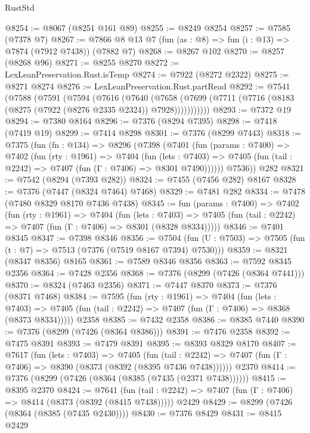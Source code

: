 \begin{lexlean}{RustStd}
\begin{coremodule}
@8254 := @8067 (@8251 @161 @89)
@8255 := @8249 @8254
@8257 := @7585 (@7378 @7)
@8267 := @7866 @8 @13 @7 (fun (as : @8) => fun (i : @13) => @7874 (@7912 @7438)) (@7882 @7)
@8268 := @8267 @102
@8270 := @8257 (@8268 @96)
@8271 := @8255 @8270
@8272 := LexLeanPreservation.Rust.isTemp
@8274 := @7922 (@8272 @2322)
@8275 := @8271 @8274
@8276 := LexLeanPreservation.Rust.partRead
@8292 := @7541
    (@7588
      (@7591
        (@7594
          (@7616
            (@7640
              (@7658 (@7699 (@7711 (@7716 (@8183 (@8275 (@7922 (@8276 @2335 @2324)) @7928)))))))))))
@8293 := @7372 @19
@8294 := @7380 @8164
@8296 := @7376 (@8294 @7395)
@8298 := @7418 (@7419 @19)
@8299 := @7414 @8298
@8301 := @7376 (@8299 @7443)
@8318 := @7375
    (fun (fn : @134) =>
    @8296
      (@7398
        (@7401
          (fun (params : @7400) =>
          @7402
            (fun (rty : @1961) =>
            @7404
              (fun (lets : @7403) =>
              @7405 (fun (tail : @2242) => @7407 (fun (Γ : @7406) => @8301 @7490))))))
        @7536))
    @282
@8321 := @7542 (@8294 (@7393 @282))
@8324 := @7455 (@7456 @282) @8167
@8328 := @7376 (@7447 (@8324 @7464) @7468)
@8329 := @7481 @282
@8334 := @7478 (@7480 @8329 @8170 @7436 @7438)
@8345 := fun (params : @7400) =>
  @7402
    (fun (rty : @1961) =>
    @7404
      (fun (lets : @7403) =>
      @7405 (fun (tail : @2242) => @7407 (fun (Γ : @7406) => @8301 (@8328 @8334)))))
@8346 := @7401 @8345
@8347 := @7398 @8346
@8356 := @7504 (fun (U : @7503) => @7505 (fun (t : @7) => @7513 (@7376 (@7519 @8167 @7394) @7530)))
@8359 := @8321 (@8347 @8356) @8165
@8361 := @7589 @8346 @8356
@8363 := @7592 @8345 @2356
@8364 := @7428 @2356
@8368 := @7376 (@8299 (@7426 (@8364 @7441)))
@8370 := @8324 (@7463 @2356)
@8371 := @7447 @8370
@8373 := @7376 (@8371 @7468)
@8384 := @7595
    (fun (rty : @1961) =>
    @7404
      (fun (lets : @7403) =>
      @7405 (fun (tail : @2242) => @7407 (fun (Γ : @7406) => @8368 (@8373 @8334)))))
    @2358
@8385 := @7432 @2358
@8386 := @8385 @7440
@8390 := @7376 (@8299 (@7426 (@8364 @8386)))
@8391 := @7476 @2358
@8392 := @7475 @8391
@8393 := @7479 @8391
@8395 := @8393 @8329 @8170
@8407 := @7617
    (fun (lets : @7403) =>
    @7405
      (fun (tail : @2242) => @7407 (fun (Γ : @7406) => @8390 (@8373 (@8392 (@8395 @7436 @7438))))))
    @2370
@8414 := @7376 (@8299 (@7426 (@8364 (@8385 (@7435 (@2371 @7438))))))
@8415 := @8395 @2370
@8424 := @7641
    (fun (tail : @2242) => @7407 (fun (Γ : @7406) => @8414 (@8373 (@8392 (@8415 @7438)))))
    @2429
@8429 := @8299 (@7426 (@8364 (@8385 (@7435 @2430))))
@8430 := @7376 @8429
@8431 := @8415 @2429

\end{coremodule}
\end{lexlean}
